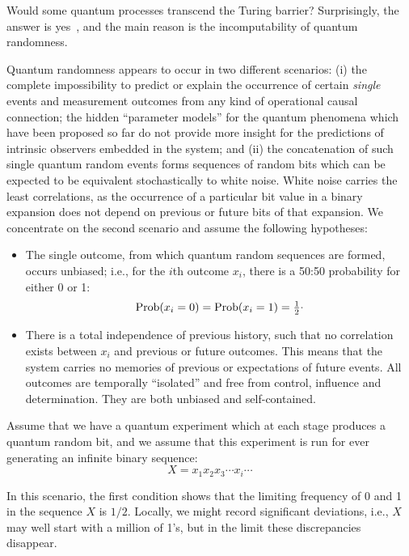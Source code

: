 \documentclass[11pt, pra,amsfonts,showpacs,showkeys]{revtex4}%
\begin{document}
Would some quantum processes transcend the Turing barrier?
Surprisingly, the answer is yes~\cite{2008-cal-svo}, and the main reason is the incomputability
of quantum randomness.

Quantum randomness appears to occur in two different scenarios:
(i) the complete impossibility to predict or explain the occurrence of certain
{\em single} events and measurement outcomes from any kind
of operational causal connection; the hidden ``parameter models'' for the quantum phenomena which
have been proposed so far do not provide more insight for the predictions
of intrinsic observers embedded in the system;
and
(ii) the concatenation of such single quantum random events forms sequences of random bits
which can be expected to be equivalent stochastically to  white noise.
White noise carries the least correlations, as the occurrence of a particular bit value
in a binary expansion does not depend on previous or future bits of that expansion.
We  concentrate on the second scenario and assume the following hypotheses:

\begin{itemize}
\item The single outcome,
from which quantum random sequences are formed, occurs unbiased; i.e.,
for the $i$th outcome $x_{i}$, there is a 50:50 probability for either 0 or 1:
\begin{equation}
\begin{array}{l}
\textrm{Prob}(x_i=0)
=
\textrm{Prob}(x_i=1)
={1\over 2}\raisebox{0.5ex}{.}
\end{array}
\end{equation}
\item   There is a total independence of previous history,
such that no correlation exists between $x_i$ and previous or future outcomes.
This means that the system carries no memories of previous or expectations of future events.
All outcomes are temporally ``isolated'' and
free from control, influence and determination.
They are both unbiased and self-contained.
\end{itemize}

Assume that we have a quantum experiment  which at each stage produces a quantum random bit, and we assume that this experiment is run for ever generating an infinite binary sequence:
\begin{equation}
\label{qrand}
X =x_1x_2x_3\cdots x_i \cdots
\end{equation}

In this scenario, the first condition shows that the limiting frequency
of 0 and 1 in the sequence $X$ is $1/2$. Locally, we might record
significant deviations, i.e., $X$ may well start with a million  of 1's, but in the limit these discrepancies disappear.
\end{document}
